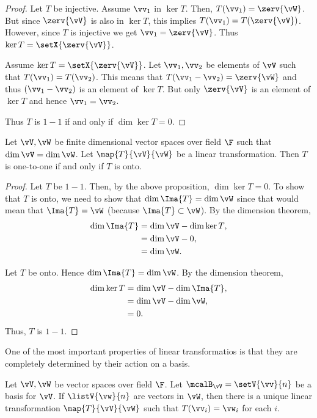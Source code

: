 \begin{proof}
    Let $T$ be injective. Assume $\vv_{1}$ in $\ker{T}$. Then,
    $T(\vv_{1}) = \zerv{\vW}$. But since $\zerv{\vV}$ is also in $\ker{T}$, this implies $T(\vv_{1}) =
    T(\zerv{\vV})$. However, since $T$ is injective we get $\vv_{1} = \zerv{\vV}$. Thus $\ker{T} =
    \setX{\zerv{\vV}}$.

    Assume $\ker{T} = \setX{\zerv{\vV}}$. Let $\vv_{1},\vv_{2}$ be elements of $\vV$ such that $T(\vv_{1}) =
    T(\vv_{2})$. This means that $T(\vv_1 - \vv_2) = \zerv{\vW}$ and thus $(\vv_1 - \vv_2)$ is an element of
    $\ker{T}$. But only $\zerv{\vV}$ is an element of $\ker{T}$ and hence $\vv_1 = \vv_2$.

    Thus $T$ is $1-1$ if and only if $\dim{\ker{T}} = 0$.
\end{proof}
\begin{Proposition}
    Let $\vV,\vW$ be finite dimensional vector spaces over field $\F$ such that $\dim{\vV} = \dim{\vW}$. Let
    $\map{T}{\vV}{\vW}$ be a linear transformation. Then $T$ is one-to-one if and only if $T$ is onto.
\end{Proposition}
\begin{proof}
    Let $T$ be $1-1$. Then, by the above proposition, $\dim{\ker{T}} = 0$.
    To show that $T$ is onto, we need to show that $\dim{\Ima{T}} = \dim{\vW}$ since that would mean that
    $\Ima{T} = \vW$ (because $\Ima{T} \subset \vW$).
    By the dimension theorem,
    \begin{align*}
	\dim{\Ima{T}} &= \dim{\vV} - \dim{\ker{T}},\\
	&= \dim{\vV} - 0,\\
	&= \dim{\vW}.
    \end{align*}

    Let $T$ be onto. Hence $\dim{\Ima{T}} = \dim{\vW}$. By the dimension theorem,
    \begin{align*}
	\dim{\ker{T}} &= \dim{\vV} - \dim{\Ima{T}},\\
	&= \dim{\vV} - \dim{\vW},\\
	&= 0.
    \end{align*}
    Thus, $T$ is $1-1$.
\end{proof}
One of the most important properties of linear transformatios is that they are completely determined by their
action on a basis.
\begin{Proposition}
    Let $\vV,\vW$ be vector spaces over field $\F$. Let $\mcalB_{\vV} = \setV{\vv}{n}$ be a basis for $\vV$.
    If $\listV{\vw}{n}$ are vectors in $\vW$, then there is a unique linear transformation $\map{T}{\vV}{\vW}$
    such that $T(\vv_i) = \vw_{i}$ for each $i$.
\end{Proposition}
